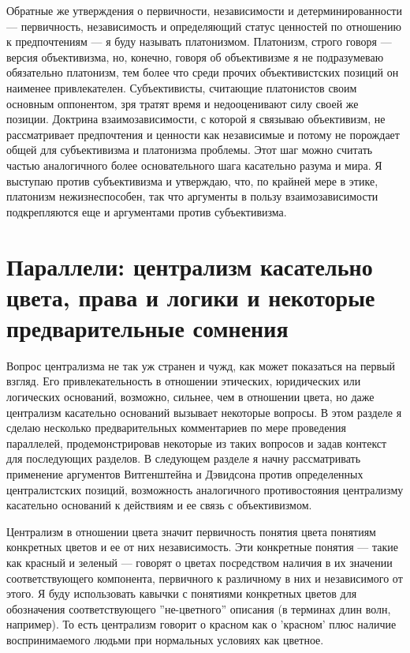 \documentclass[11pt]{book}
\begin{document}
Обратные же утверждения о первичности, независимости и детерминированности --- первичность, независимость и определяющий статус ценностей по отношению к предпочтениям --- я буду называть платонизмом. Платонизм, строго говоря --- версия объективизма, но, конечно, говоря об объективизме я не подразумеваю обязательно платонизм, тем более что среди прочих объективистских позиций он наименее привлекателен. Субъективисты, считающие платонистов своим основным оппонентом, зря тратят время и недооценивают силу своей же позиции. Доктрина взаимозависимости, с которой я связываю объективизм, не рассматривает предпочтения и ценности как независимые и потому не порождает общей для субъективизма и платонизма проблемы. Этот шаг можно считать частью аналогичного более основательного шага касательно разума и мира. Я выступаю против субъективизма и утверждаю, что, по крайней мере в этике, платонизм нежизнеспособен, так что аргументы в пользу взаимозависимости подкрепляются еще и аргументами против субъективизма.

\section{Параллели: централизм касательно цвета, права и логики и некоторые предварительные сомнения}

Вопрос централизма не так уж странен и чужд, как может показаться на первый взгляд. Его привлекательность в отношении этических, юридических или логических оснований, возможно, сильнее, чем в отношении цвета, но даже централизм касательно оснований вызывает некоторые вопросы. В этом разделе я сделаю несколько предварительных комментариев по мере проведения параллелей, продемонстрировав некоторые из таких вопросов и задав контекст для последующих разделов. В следующем разделе я начну рассматривать применение аргументов Витгенштейна и Дэвидсона против определенных централистских позиций, возможность аналогичного противостояния централизму касательно оснований к действиям и ее связь с объективизмом.

Централизм в отношении цвета значит первичность понятия цвета понятиям конкретных цветов и ее от них независимость. Эти конкретные понятия --- такие как красный и зеленый --- говорят о цветах посредством наличия в их значении соответствующего компонента, первичного к различному в них и независимого от этого. Я буду использовать кавычки с понятиями конкретных цветов для обозначения соответствующего ''не-цветного'' описания (в терминах длин волн, например). То есть централизм говорит о красном как о 'красном' плюс наличие воспринимаемого людьми при нормальных условиях как цветное.
\end{document}
